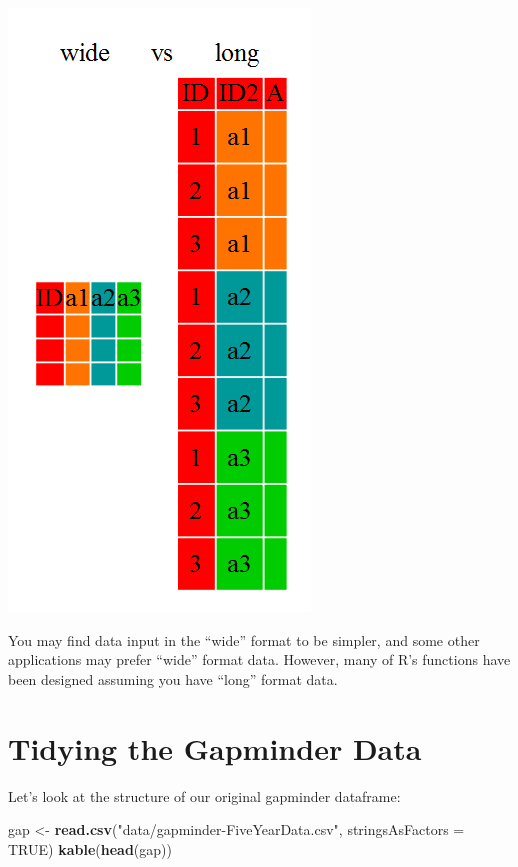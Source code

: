 \documentclass[]{book}
\newenvironment{Shaded}{\begin{snugshade}}{\end{snugshade}}
\newcommand{\DataTypeTok}[1]{\textcolor[rgb]{0.13,0.29,0.53}{#1}}
\newcommand{\KeywordTok}[1]{\textcolor[rgb]{0.13,0.29,0.53}{\textbf{#1}}}
\newcommand{\NormalTok}[1]{#1}
\newcommand{\OtherTok}[1]{\textcolor[rgb]{0.56,0.35,0.01}{#1}}
\newcommand{\StringTok}[1]{\textcolor[rgb]{0.31,0.60,0.02}{#1}}
\begin{document}
\begin{center}\includegraphics[width=0.7\linewidth]{img/tidyr-fig1} \end{center}

You may find data input in the ``wide'' format to be simpler, and some other applications may prefer ``wide'' format data. However, many of R's functions have been designed assuming you have ``long'' format data.

\hypertarget{tidying-the-gapminder-data}{%
\section{Tidying the Gapminder Data}\label{tidying-the-gapminder-data}}

Let's look at the structure of our original gapminder dataframe:

\begin{Shaded}
\begin{Highlighting}[]
\NormalTok{gap <-}\StringTok{ }\KeywordTok{read.csv}\NormalTok{(}\StringTok{"data/gapminder-FiveYearData.csv"}\NormalTok{, }\DataTypeTok{stringsAsFactors =} \OtherTok{TRUE}\NormalTok{)}
\KeywordTok{kable}\NormalTok{(}\KeywordTok{head}\NormalTok{(gap))}
\end{Highlighting}
\end{Shaded}
\end{document}
